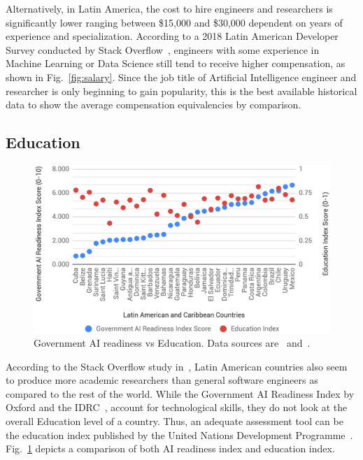 \documentclass[conference]{IEEEtran}
\begin{document}
Alternatively, in Latin America, the cost to hire engineers and researchers is significantly lower ranging between \$15,000 and \$30,000 dependent on years of experience and specialization. According to a 2018 Latin American Developer Survey conducted by Stack Overflow~\cite{silge2018hiring}, engineers with some experience in Machine Learning or Data Science still tend to receive higher compensation, as shown in Fig.~\ref{fig:salary}. Since the job title of Artificial Intelligence engineer and researcher is only beginning to gain popularity, this is the best available historical data to show the average compensation equivalencies by comparison.


\subsection{Education}
\begin{figure}[!b]
\centering
\includegraphics[width=\columnwidth]{education}
\caption{Government AI readiness vs Education. Data sources are~\cite{miller2019government} and~\cite{undp2018education}.}
\label{fig:education}
\end{figure}

According to the Stack Overflow study in~\cite{silge2018hiring}, Latin American countries also seem to produce more academic researchers than general software engineers as compared to the rest of the world. While the Government AI Readiness Index by Oxford and the IDRC~\cite{miller2019government}, account for technological skills, they do not look at the overall Education level of a country. Thus, an adequate assessment tool can be the education index published by the United Nations Development Programme~\cite{undp2018education}. Fig.~\ref{fig:education} depicts a comparison of both AI readiness index and education index.
\end{document}
